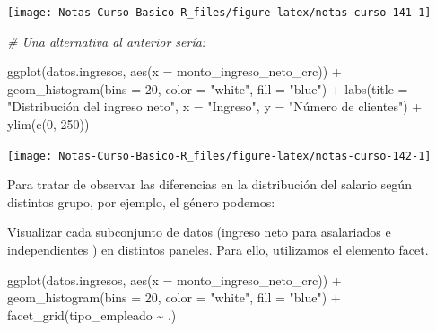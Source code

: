 \documentclass[
  12pt,
]{book}
\newenvironment{Shaded}{\begin{snugshade}}{\end{snugshade}}
\newcommand{\AttributeTok}[1]{\textcolor[rgb]{0.77,0.63,0.00}{#1}}
\newcommand{\CommentTok}[1]{\textcolor[rgb]{0.56,0.35,0.01}{\textit{#1}}}
\newcommand{\DecValTok}[1]{\textcolor[rgb]{0.00,0.00,0.81}{#1}}
\newcommand{\FunctionTok}[1]{\textcolor[rgb]{0.00,0.00,0.00}{#1}}
\newcommand{\NormalTok}[1]{#1}
\newcommand{\SpecialCharTok}[1]{\textcolor[rgb]{0.00,0.00,0.00}{#1}}
\newcommand{\StringTok}[1]{\textcolor[rgb]{0.31,0.60,0.02}{#1}}
\begin{document}
\begin{center}\texttt{[image: Notas-Curso-Basico-R\_files/figure-latex/notas-curso-141-1]} \end{center}

\begin{Shaded}
\begin{Highlighting}[]
\CommentTok{\# Una alternativa al anterior sería:}

\FunctionTok{ggplot}\NormalTok{(datos.ingresos, }\FunctionTok{aes}\NormalTok{(}\AttributeTok{x =}\NormalTok{ monto\_ingreso\_neto\_crc)) }\SpecialCharTok{+}
  \FunctionTok{geom\_histogram}\NormalTok{(}\AttributeTok{bins =} \DecValTok{20}\NormalTok{, }\AttributeTok{color =} \StringTok{"white"}\NormalTok{, }\AttributeTok{fill =} \StringTok{"blue"}\NormalTok{) }\SpecialCharTok{+}
  \FunctionTok{labs}\NormalTok{(}\AttributeTok{title =} \StringTok{"Distribución del ingreso neto"}\NormalTok{,}
    \AttributeTok{x =} \StringTok{"Ingreso"}\NormalTok{,}
    \AttributeTok{y =} \StringTok{"Número de clientes"}\NormalTok{) }\SpecialCharTok{+}
  \FunctionTok{ylim}\NormalTok{(}\FunctionTok{c}\NormalTok{(}\DecValTok{0}\NormalTok{, }\DecValTok{250}\NormalTok{))}
\end{Highlighting}
\end{Shaded}

\begin{center}\texttt{[image: Notas-Curso-Basico-R\_files/figure-latex/notas-curso-142-1]} \end{center}

Para tratar de observar las diferencias en la distribución del salario según distintos grupo, por ejemplo, el género podemos:

Visualizar cada subconjunto de datos (ingreso neto para asalariados e independientes ) en distintos paneles. Para ello, utilizamos el elemento facet.

\begin{Shaded}
\begin{Highlighting}[]
\FunctionTok{ggplot}\NormalTok{(datos.ingresos, }\FunctionTok{aes}\NormalTok{(}\AttributeTok{x =}\NormalTok{ monto\_ingreso\_neto\_crc)) }\SpecialCharTok{+}
  \FunctionTok{geom\_histogram}\NormalTok{(}\AttributeTok{bins =} \DecValTok{20}\NormalTok{, }\AttributeTok{color =} \StringTok{"white"}\NormalTok{, }\AttributeTok{fill =} \StringTok{"blue"}\NormalTok{) }\SpecialCharTok{+}
  \FunctionTok{facet\_grid}\NormalTok{(tipo\_empleado }\SpecialCharTok{\textasciitilde{}}\NormalTok{ .)}
\end{Highlighting}
\end{Shaded}
\end{document}
